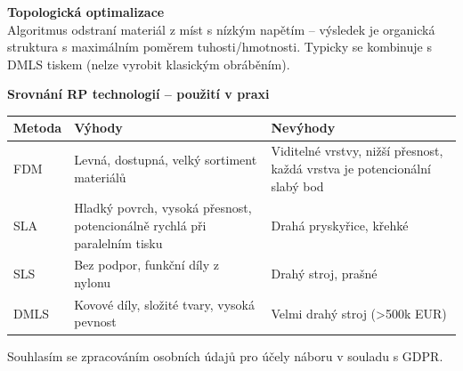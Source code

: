 \documentclass[a4paper,10pt]{article}
\begin{document}
\begin{vysvetlenibox}
\textbf{Topologická optimalizace}\\
Algoritmus odstraní materiál z míst s nízkým napětím -- výsledek
je organická struktura s maximálním poměrem tuhosti/hmotnosti.
Typicky se kombinuje s DMLS tiskem (nelze vyrobit klasickým obráběním).

\textbf{Srovnání RP technologií -- použití v praxi}

\begin{center}
\begin{tabularx}{0.95\linewidth}{@{} l X X @{}}
    \toprule
    \textbf{Metoda} & \textbf{Výhody} & \textbf{Nevýhody} \\
    \midrule
    FDM  & Levná, dostupná, velký sortiment materiálů
         & Viditelné vrstvy, nižší přesnost, každá vrstva je potencionální slabý bod \\
    SLA  & Hladký povrch, vysoká přesnost, potencionálně rychlá při paralelním tisku
         & Drahá pryskyřice, křehké \\
    SLS  & Bez podpor, funkční díly z nylonu
         & Drahý stroj, prašné \\
    DMLS & Kovové díly, složité tvary, vysoká pevnost
         & Velmi drahý stroj (\textgreater{}500k EUR) \\
    \bottomrule
\end{tabularx}
\end{center}
\end{vysvetlenibox}

\vfill
\noindent\textcolor{medgray}{\small
Souhlasím se zpracováním osobních údajů pro účely náboru v souladu s GDPR.}
\end{document}
